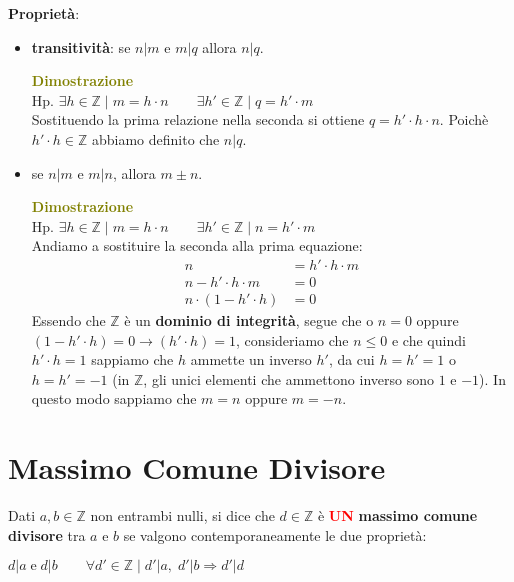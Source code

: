 \textbf{Proprietà}:
\begin{itemize}[nosep]
    \item \textbf{transitività}: se $n|m$ e $m|q$ allora $n|q$.
    \begin{boxA}
        \textcolor{olive}{\textbf{Dimostrazione}} \\
        Hp. $\exists h \in \mathbb{Z} \; | \; m = h \cdot n \qquad \exists h' \in \mathbb{Z} \; | \; q = h' \cdot m$ \\
        Sostituendo la prima relazione nella seconda si ottiene $q = h' \cdot h \cdot n$. Poichè $h' \cdot h \in \mathbb{Z}$ abbiamo definito che $n|q$.
    \end{boxA}

    \item se $n|m$ e $m|n$, allora $m \pm n$.
    \begin{boxA}
        \textcolor{olive}{\textbf{Dimostrazione}} \\
        Hp. $\exists h \in \mathbb{Z} \; | \; m = h \cdot n \qquad \exists h' \in \mathbb{Z} \; | \; n = h' \cdot m$ \\
        Andiamo a sostituire la seconda alla prima equazione:
        \begin{align*}
            n &= h' \cdot h \cdot m \\
            n - h' \cdot h \cdot m &= 0 \\
            n \cdot (1 - h' \cdot h) &= 0
        \end{align*}
        Essendo che $\mathbb{Z}$ è un \textbf{dominio di integrità}, segue che o $n = 0$ oppure $(1 - h' \cdot h) = 0 \rightarrow (h' \cdot h) = 1$, consideriamo che $n \leq 0$ e che quindi $h' \cdot h = 1$ sappiamo che $h$ ammette un inverso $h'$, da cui $h = h' = 1$ o $h = h' = -1$ (in $\mathbb{Z}$, gli unici elementi che ammettono inverso sono $1$ e $-1$). In questo modo sappiamo che $m=n$ oppure $m=-n$.
    \end{boxA}
\end{itemize}

\section{Massimo Comune Divisore}
Dati $a,b \in \mathbb{Z}$ non entrambi nulli, si dice che $d \in \mathbb{Z}$ è \textcolor{red}{\textbf{UN}} \textbf{massimo comune divisore} tra $a$ e $b$ se valgono contemporaneamente le due proprietà:
\begin{center}
    $d|a \; \text{e} \; d|b \qquad \forall d' \in \mathbb{Z} \; | \; d'|a, \; d'|b \Rightarrow d'|d$
\end{center}

